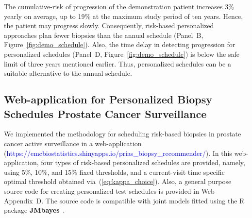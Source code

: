 The cumulative-risk of progression of the demonstration patient increases 3\% yearly on average, up to 19\% at the maximum study period of ten years. Hence, the patient may progress slowly. Consequently, risk-based personalized approaches plan fewer biopsies than the annual schedule (Panel~B, Figure~\ref{fig:demo_schedule}). Also, the time delay in detecting progression for personalized schedules (Panel~D, Figure~\ref{fig:demo_schedule}) is below the safe limit of three years mentioned earlier. Thus, personalized schedules can be a suitable alternative to the annual schedule.

\subsection{Web-application for Personalized Biopsy Schedules Prostate Cancer Surveillance}
We implemented the methodology for scheduling risk-based biopsies in prostate cancer active surveillance in a web-application (\textcolor{blue}{https://emcbiostatistics.shinyapps.io/prias\_biopsy\_recommender/}). In this web-application, four types of risk-based personalized schedules are provided, namely, using 5\%, 10\%, and 15\% fixed thresholds, and a current-visit time specific optimal threshold obtained via~(\ref{eq:kappa_choice}). Also, a general purpose source code for creating personalized test schedules is provided in Web-Appendix~D. The source code is compatible with joint models fitted using the R package \textbf{JMbayes}~\citep{rizopoulosJMbayes}.